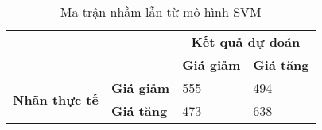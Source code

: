 \narrowlinespacing

\begin{table}[H] 
    \centering

    \begin{tabularx}{0.7\textwidth}{
    p{}%
    p{}%
    p{}
    p{}
    }
        
        \toprule\midrule
        \textbf{} & \textbf{} & \multicolumn{2}{c}{\textbf{Kết quả dự đoán}} \\
        \cmidrule(rl){3-4}
        \textbf{} & \textbf{} & \textbf{Giá giảm} & \textbf{Giá tăng} \\
        \midrule
        
        
        \multirow{2}{*}{\textbf{Nhãn thực tế }}  & \textbf{Giá giảm} & 555 & 494\\
        & \textbf{Giá tăng} & 473 & 638 \\
        \midrule
        \bottomrule
        
    \end{tabularx}
    \label{tab:svm_confusion_matrix}
    \caption{Ma trận nhầm lẫn từ mô hình SVM}
\end{table}

\normallinespacing
